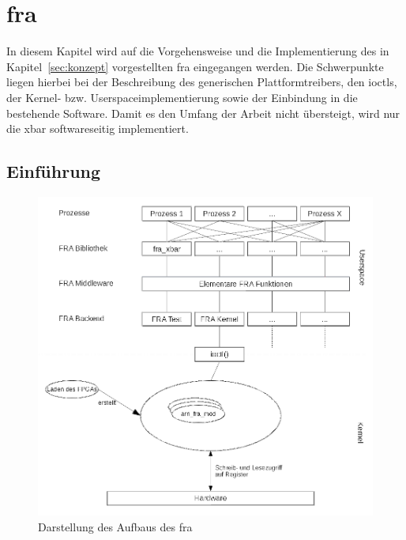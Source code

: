 \chapter{\acl{fra}} \label{sec:haupt}
In diesem Kapitel wird auf die  Vorgehensweise und die Implementierung des in Kapitel~\ref{sec:konzept} vorgestellten \ac{fra} eingegangen werden. Die Schwerpunkte liegen hierbei bei der Beschreibung des generischen Plattformtreibers, den \ac{ioctl}s, der Kernel- bzw. Userspaceimplementierung sowie der Einbindung in die bestehende Software. Damit es den Umfang der Arbeit nicht übersteigt, wird nur die \ac{xbar} softwareseitig implementiert.

\section{Einführung}

\begin{figure}[!hbtp]
	\centering
	\includegraphics[width = \linewidth]{pictures/2020-01-10_FRA_Overview.png}
	\smallskip
	\caption{Darstellung des Aufbaus des \ac{fra}}
	\label{fig:overview}
\end{figure} 

